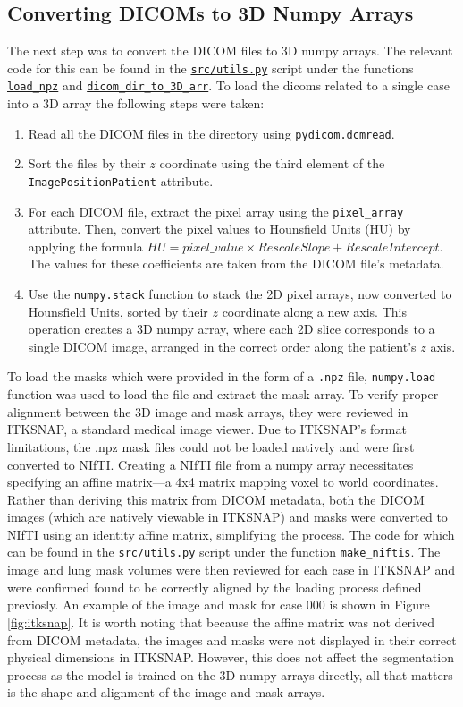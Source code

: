 \documentclass[11pt]{article}
\begin{document}
\subsection{Converting DICOMs to 3D Numpy Arrays}
The next step was to convert the DICOM files to 3D numpy arrays. The relevant code for this can be found in the \texttt{\url{src/utils.py}} script under the functions \texttt{\url{load\_npz}} and \texttt{\url{dicom\_dir\_to\_3D\_arr}}. To load the dicoms related to a single case into a 3D array the following steps were taken:

\begin{enumerate}
    \item Read all the DICOM files in the directory using \texttt{pydicom.dcmread}.
    \item Sort the files by their $z$ coordinate using the third element of the \texttt{ImagePositionPatient} attribute.
    \item For each DICOM file, extract the pixel array using the \texttt{pixel\_array} attribute. Then, convert the pixel values to Hounsfield Units (HU) by applying the formula $HU = pixel\_value \times RescaleSlope + RescaleIntercept$. The values for these coefficients are taken from the DICOM file's metadata.
    \item Use the \texttt{numpy.stack} function to stack the 2D pixel arrays, now converted to Hounsfield Units, sorted by their $z$ coordinate along a new axis. This operation creates a 3D numpy array, where each 2D slice corresponds to a single DICOM image, arranged in the correct order along the patient's $z$ axis.
\end{enumerate}

To load the masks which were provided in the form of a \texttt{.npz} file, 
\texttt{numpy.load} function was used to load the file and extract the mask array.
To verify proper alignment between the 3D image and mask arrays, they were reviewed in ITKSNAP, a standard medical image viewer. Due to ITKSNAP's format limitations, the .npz mask files could not be loaded natively and were first converted to NIfTI. Creating a NIfTI file from a numpy array necessitates specifying an affine matrix—a 4x4 matrix mapping voxel to world coordinates. Rather than deriving this matrix from DICOM metadata, both the DICOM images (which are natively viewable in ITKSNAP) and masks were converted to NIfTI using an identity affine matrix, simplifying the process. The code for which can be found in the \texttt{\url{src/utils.py}} script under the function \texttt{\url{make_niftis}}. The image and lung mask volumes were then reviewed for each case in ITKSNAP and were confirmed found to be correctly aligned by the loading process defined previosly. An example of the image and mask for case 000 is shown in Figure \ref{fig:itksnap}. It is worth noting that because the affine matrix was not derived from DICOM metadata, the images and masks were not displayed in their correct physical dimensions in ITKSNAP. However, this does not affect the segmentation process as the model is trained on the 3D numpy arrays directly, all that matters is the shape and alignment of the image and mask arrays.
\end{document}
